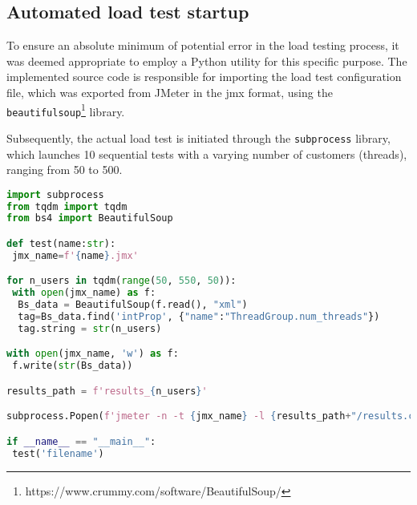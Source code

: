 \subsection{Automated load test startup}

To ensure an absolute minimum of potential error in the load testing process, it was deemed appropriate to employ a Python utility for this specific purpose. 
The implemented source code is responsible for importing the load test configuration file, which was exported from JMeter in the jmx format, using the \verb|beautifulsoup|\footnote[2]{https://www.crummy.com/software/BeautifulSoup/} library.

Subsequently, the actual load test is initiated through the \verb|subprocess| library, which launches 10 sequential tests with a varying number of customers (threads), ranging from 50 to 500.

\vspace{8mm}

\begin{lstlisting}[language=Python, caption={Python script for automated load test startup}, label={lst:python-script}]
import subprocess
from tqdm import tqdm
from bs4 import BeautifulSoup

def test(name:str):
 jmx_name=f'{name}.jmx'

for n_users in tqdm(range(50, 550, 50)):      
 with open(jmx_name) as f:
  Bs_data = BeautifulSoup(f.read(), "xml")
  tag=Bs_data.find('intProp', {"name":"ThreadGroup.num_threads"})
  tag.string = str(n_users)

with open(jmx_name, 'w') as f:
 f.write(str(Bs_data))

results_path = f'results_{n_users}'

subprocess.Popen(f'jmeter -n -t {jmx_name} -l {results_path+"/results.csv"} -e -o {results_path}', shell=True, stdout=subprocess.DEVNULL).wait()

if __name__ == "__main__":
 test('filename')
\end{lstlisting}
